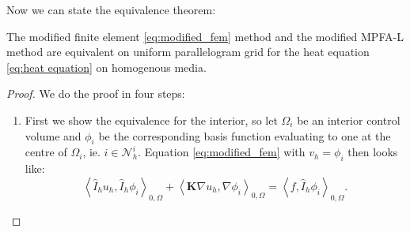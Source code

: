 \documentclass[../Main/main.tex]{subfiles}
\begin{document}
	Now we can state the equivalence theorem:
	\begin{theorem}
		The modified finite element \eqref{eq:modified_fem} method and the modified MPFA-L method are equivalent on uniform parallelogram grid for the heat equation \eqref{eq:heat equation} on homogenous media. 
	\end{theorem}

	\begin{proof}
		We do the proof in four steps:
		\begin{enumerate}
			\item First we show the equivalence for the interior, so
			let $\Omega_i$ be an interior control volume and $\phi_i$ be the corresponding basis function evaluating to one at the centre of $\Omega_i$, ie. $i \in \mathcal{N}_h^i$.
			Equation \eqref{eq:modified_fem} with $v_h=\phi_i$ then looks like:
			\begin{equation}\label{eq:modified fem interior}
				\left \langle \hat{I}_h u_h,\hat{I}_h \phi_i \right \rangle_{0,\Omega} +   \left \langle \pmb{K} \nabla u_h,\nabla \phi_i \right \rangle_{0,\Omega} = \left \langle f,\hat{I}_h \phi_i \right \rangle_{0,\Omega} .
			\end{equation}
			

\end{enumerate}
\end{proof}
\end{document}
